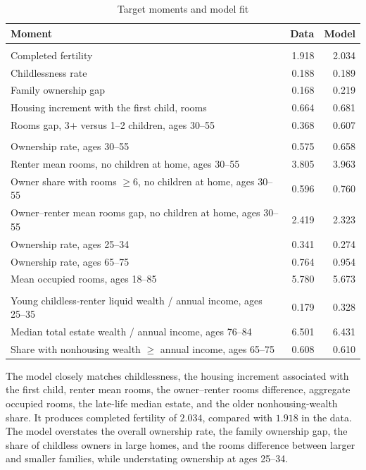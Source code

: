 \begin{table}[H]
\centering
\caption{Target moments and model fit}
\label{tab:quant_fit}
\small
\begin{tabularx}{0.94\textwidth}{@{}>{\raggedright\arraybackslash}X r r@{}}
\toprule
Moment & Data & Model \\
\midrule
\multicolumn{3}{@{}l}{\emph{Family size and family housing}} \\
Completed fertility & 1.918 & 2.034 \\
Childlessness rate & 0.188 & 0.189 \\
Family ownership gap & 0.168 & 0.219 \\
Housing increment with the first child, rooms & 0.664 & 0.681 \\
Rooms gap, 3$+$ versus 1--2 children, ages 30--55 & 0.368 & 0.607 \\
\addlinespace
\multicolumn{3}{@{}l}{\emph{Tenure and housing consumption}} \\
Ownership rate, ages 30--55 & 0.575 & 0.658 \\
Renter mean rooms, no children at home, ages 30--55 & 3.805 & 3.963 \\
Owner share with rooms $\ge6$, no children at home, ages 30--55 & 0.596 & 0.760 \\
Owner--renter mean rooms gap, no children at home, ages 30--55 & 2.419 & 2.323 \\
Ownership rate, ages 25--34 & 0.341 & 0.274 \\
Ownership rate, ages 65--75 & 0.764 & 0.954 \\
Mean occupied rooms, ages 18--85 & 5.780 & 5.673 \\
\addlinespace
\multicolumn{3}{@{}l}{\emph{Wealth and bequests}} \\
Young childless-renter liquid wealth / annual income, ages 25--35 & 0.179 & 0.328 \\
Median total estate wealth / annual income, ages 76--84 & 6.501 & 6.431 \\
Share with nonhousing wealth $\ge$ annual income, ages 65--75 & 0.608 & 0.610 \\
\bottomrule
\end{tabularx}
\end{table}

The model closely matches childlessness, the housing increment associated with
the first child, renter mean rooms, the owner--renter rooms difference,
aggregate occupied rooms, the late-life median estate, and the older
nonhousing-wealth share. It produces completed fertility of $2.034$, compared
with $1.918$ in the data. The model overstates the overall ownership rate, the
family ownership gap, the share of childless owners in large homes, and the
rooms difference
between larger and smaller families, while understating ownership at ages
25--34.


